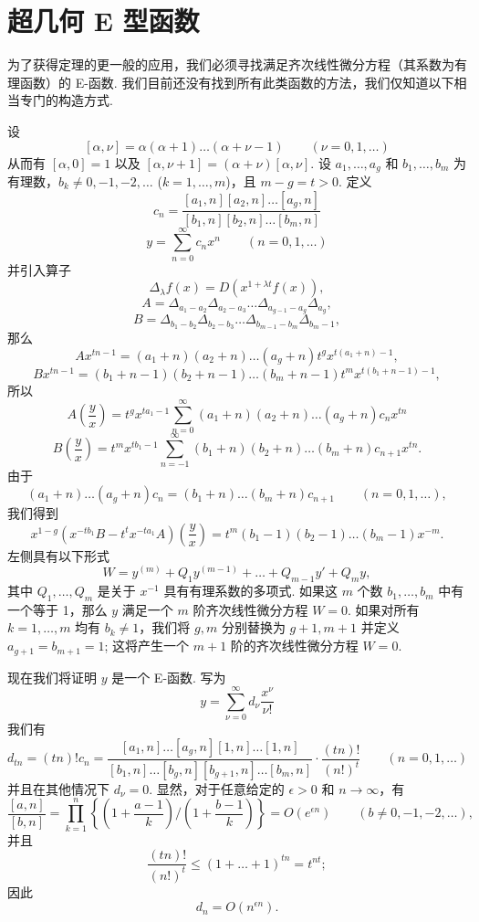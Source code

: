 \section{超几何 E 型函数}

为了获得定理的更一般的应用，我们必须寻找满足齐次线性微分方程（其系数为有理函数）的 E-函数. 我们目前还没有找到所有此类函数的方法，我们仅知道以下相当专门的构造方式.

设
\[[\alpha, \nu] = \alpha(\alpha + 1) \dots (\alpha + \nu - 1) \qquad (\nu = 0, 1, \dots)\]
从而有 $[\alpha, 0] = 1$ 以及 $[\alpha, \nu+1] = (\alpha+\nu)[\alpha, \nu]$. 设 $a_1, \dots, a_g$ 和 $b_1, \dots, b_m$ 为有理数，$b_k \neq 0, -1, -2, \dots$ ($k=1, \dots, m$)，且 $m-g=t > 0$. 定义
\[c_{n} = \frac{[a_{1},n][a_{2},n]\dots[a_{g},n]}{[b_{1},n][b_{2},n]\dots[b_{m},n]}\]
\[y = \sum_{n=0}^{\infty} c_{n}x^{n} \qquad (n=0,1,\dots)\]
并引入算子
\[\Delta_{\lambda} f(x) = D(x^{1+\lambda t} f(x)),\]
\[A = \Delta_{a_1 - a_2} \Delta_{a_2 - a_3} \dots \Delta_{a_{g-1} - a_g} \Delta_{a_g},\]
\[B = \Delta_{b_1 - b_2} \Delta_{b_2 - b_3} \dots \Delta_{b_{m-1} - b_m} \Delta_{b_m - 1},\]
那么
\[A x^{tn-1} = (a_1+n)(a_2+n) \dots (a_g+n)t^g x^{t(a_1+n)-1},\]
\[B x^{tn-1} = (b_1+n-1)(b_2+n-1) \dots (b_m+n-1)t^m x^{t(b_1+n-1)-1},\]
所以
\[A \left(\frac{y}{x}\right) = t^g x^{ta_1-1} \sum_{n=0}^{\infty} (a_1+n)(a_2+n) \dots (a_g+n)c_n x^{tn}\]
\[B \left(\frac{y}{x}\right) = t^{m} x^{tb_{1}-1} \sum_{n=-1}^{\infty} (b_{1}+n)(b_{2}+n) \dots (b_{m}+n) c_{n+1} x^{tn}.\]
由于
\[(a_1+n)\dots(a_g+n)c_n = (b_1+n)\dots(b_m+n)c_{n+1} \qquad (n=0,1,\dots),\]
我们得到
\[x^{1-g}(x^{-tb_1}B - t^t x^{-ta_1}A) \left(\frac{y}{x}\right) = t^m(b_1-1)(b_2-1)\dots(b_m-1)x^{-m}.\]
左侧具有以下形式
\[W = y^{(m)} + Q_1 y^{(m-1)} + \dots + Q_{m-1} y' + Q_m y,\]
其中 $Q_1, \dots, Q_m$ 是关于 $x^{-1}$ 具有有理系数的多项式. 如果这 $m$ 个数 $b_1, \dots, b_m$ 中有一个等于 1，那么 $y$ 满足一个 $m$ 阶齐次线性微分方程 $W=0$. 如果对所有 $k=1,\dots,m$ 均有 $b_k \neq 1$，我们将 $g,m$ 分别替换为 $g+1, m+1$ 并定义 $a_{g+1}=b_{m+1}=1$; 这将产生一个 $m+1$ 阶的齐次线性微分方程 $W=0$.

现在我们将证明 $y$ 是一个 E-函数. 写为
\[y = \sum_{\nu=0}^{\infty} d_{\nu} \frac{x^{\nu}}{\nu!}\]
我们有
\begin{equation}
d_{tn} = (tn)! c_{n} = \frac{[a_{1},n]\dots[a_{g},n][1,n]\dots[1,n]}{[b_{1},n]\dots[b_{g},n][b_{g+1},n]\dots[b_{m},n]} \cdot \frac{(tn)!}{(n!)^{t}} \qquad (n=0,1,\dots) \tag{87}\label{eq:87}
\end{equation}
并且在其他情况下 $d_{\nu} = 0$. 显然，对于任意给定的 $\epsilon > 0$ 和 $n \to \infty$，有
\[\frac{[a,n]}{[b,n]} = \prod_{k=1}^{n} \left\{ \left(1 + \frac{a-1}{k}\right) \Big/ \left(1 + \frac{b-1}{k}\right) \right\} = O(e^{\epsilon n}) \qquad (b \neq 0, -1, -2, \dots),\]
并且
\[\frac{(tn)!}{(n!)^{t}} \le (1+\dots+1)^{tn} = t^{nt};\]
因此
\[d_n = O(n^{\epsilon n}).\]

